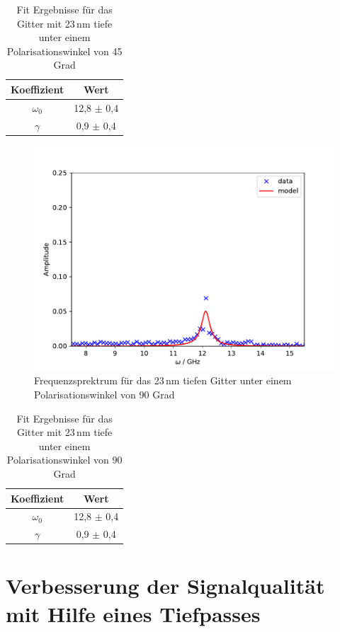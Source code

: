 \begin{table}[h!]
 \centering
\begin{tabular}{cc}
    Koeffizient & Wert \\
	\midrule
 	$\omega_0$ & 12,8 $\pm$ 0,4 \\
 	$\gamma$ & 0,9 $\pm$ 0,4 \\
\end{tabular}
\caption{Fit Ergebnisse für das Gitter mit 23\,nm tiefe unter einem Polarisationswinkel von 45 Grad}
\label{tab:fit}
\end{table}

\begin{figure}[h!]
 	\centering
 	\includegraphics[width=\textwidth]{img/009_a000_b0_e245_G4_90fft.pdf}
 	\caption{Frequenzsprektrum für das 23\,nm tiefen Gitter unter einem Polarisationswinkel von 90 Grad}
 	\label{abb:film}
\end{figure}

\begin{table}[h!]
 \centering
\begin{tabular}{cc}
    Koeffizient & Wert \\
	\midrule
 	$\omega_0$ & 12,8 $\pm$ 0,4 \\
 	$\gamma$ & 0,9 $\pm$ 0,4 \\
\end{tabular}
\caption{Fit Ergebnisse für das Gitter mit 23\,nm tiefe unter einem Polarisationswinkel von 90 Grad}
\label{tab:fit}
\end{table}
\section{Verbesserung der Signalqualität mit Hilfe eines Tiefpasses}